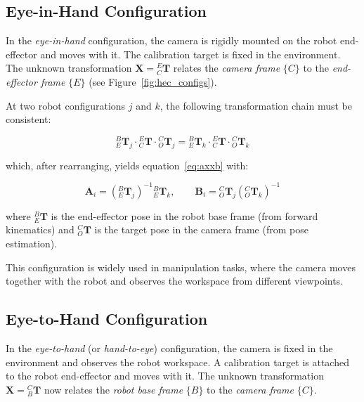 \subsection{Eye-in-Hand Configuration}
\label{subsec:eye_in_hand}

In the \textit{eye-in-hand} configuration, the camera is rigidly mounted on the
robot end-effector and moves with it. The calibration target is fixed in the
environment. The unknown transformation $\mathbf{X} = {}^E_C\mathbf{T}$ relates
the \textit{camera frame} $\{C\}$ to the \textit{end-effector frame} $\{E\}$
(see Figure~\ref{fig:hec_configs}).

At two robot configurations $j$ and $k$, the following transformation chain must
be consistent:

\begin{equation}
    {}^B_E\mathbf{T}_j \cdot {}^E_C\mathbf{T} \cdot {}^C_O\mathbf{T}_j
    =
    {}^B_E\mathbf{T}_k \cdot {}^E_C\mathbf{T} \cdot {}^C_O\mathbf{T}_k
    \label{eq:chain_eih}
\end{equation}

\noindent which, after rearranging, yields equation~\eqref{eq:axxb} with:

\begin{equation}
    \mathbf{A}_i = \left({}^B_E\mathbf{T}_j\right)^{-1} {}^B_E\mathbf{T}_k,
    \qquad
    \mathbf{B}_i = {}^C_O\mathbf{T}_j \left({}^C_O\mathbf{T}_k\right)^{-1}
    \label{eq:AB_eih}
\end{equation}

\noindent where ${}^B_E\mathbf{T}$ is the end-effector pose in the robot base
frame (from forward kinematics) and ${}^C_O\mathbf{T}$ is the target pose in the
camera frame (from pose estimation).

This configuration is widely used in manipulation tasks, where the camera moves
together with the robot and observes the workspace from different viewpoints.

\subsection{Eye-to-Hand Configuration}
\label{subsec:eye_to_hand}

In the \textit{eye-to-hand} (or \textit{hand-to-eye}) configuration, the camera
is fixed in the environment and observes the robot workspace. A calibration
target is attached to the robot end-effector and moves with it. The unknown
transformation $\mathbf{X} = {}^C_B\mathbf{T}$ now relates the
\textit{robot base frame} $\{B\}$ to the \textit{camera frame} $\{C\}$.


